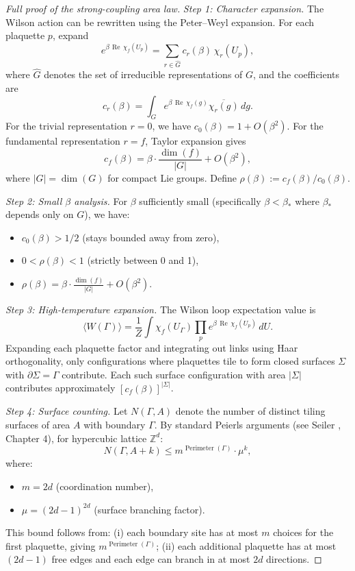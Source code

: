 \documentclass[11pt]{amsart}
\begin{document}
\begin{proof}[Full proof of the strong-coupling area law]
\emph{Step 1: Character expansion.} The Wilson action can be rewritten using the Peter–Weyl expansion. For each plaquette $p$, expand
\[
  e^{\beta\,\operatorname{Re}\,\chi_f(U_p)} = \sum_{r \in \widehat{G}} c_r(\beta)\,\chi_r(U_p),
\]
where $\widehat{G}$ denotes the set of irreducible representations of $G$, and the coefficients are
\[
  c_r(\beta) = \int_G e^{\beta\,\operatorname{Re}\,\chi_f(g)} \overline{\chi_r(g)}\,dg.
\]
For the trivial representation $r = 0$, we have $c_0(\beta) = 1 + O(\beta^2)$. For the fundamental representation $r = f$, Taylor expansion gives
\[
  c_f(\beta) = \beta \cdot \frac{\dim(f)}{|G|} + O(\beta^2),
\]
where $|G| = \dim(G)$ for compact Lie groups. Define $\rho(\beta) := c_f(\beta)/c_0(\beta)$.

\emph{Step 2: Small $\beta$ analysis.} For $\beta$ sufficiently small (specifically $\beta < \beta_*$ where $\beta_*$ depends only on $G$), we have:
\begin{itemize}
  \item $c_0(\beta) > 1/2$ (stays bounded away from zero),
  \item $0 < \rho(\beta) < 1$ (strictly between 0 and 1),
  \item $\rho(\beta) = \beta \cdot \frac{\dim(f)}{|G|} + O(\beta^2)$.
\end{itemize}

\emph{Step 3: High-temperature expansion.} The Wilson loop expectation value is
\[
  \langle W(\Gamma) \rangle = \frac{1}{Z} \int \chi_f(U_\Gamma) \prod_p e^{\beta\,\operatorname{Re}\,\chi_f(U_p)} \,dU.
\]
Expanding each plaquette factor and integrating out links using Haar orthogonality, only configurations where plaquettes tile to form closed surfaces $\Sigma$ with $\partial\Sigma = \Gamma$ contribute. Each such surface configuration with area $|\Sigma|$ contributes approximately $[c_f(\beta)]^{|\Sigma|}$.

\emph{Step 4: Surface counting.} Let $N(\Gamma, A)$ denote the number of distinct tiling surfaces of area $A$ with boundary $\Gamma$. By standard Peierls arguments (see Seiler \cite{Seiler1982}, Chapter 4), for hypercubic lattice $\mathbb{Z}^d$:
\[
  N(\Gamma, A + k) \le m^{\operatorname{Perimeter}(\Gamma)} \cdot \mu^k,
\]
where:
\begin{itemize}
  \item $m = 2d$ (coordination number),
  \item $\mu = (2d-1)^{2d}$ (surface branching factor).
\end{itemize}
This bound follows from: (i) each boundary site has at most $m$ choices for the first plaquette, giving $m^{\operatorname{Perimeter}(\Gamma)}$; (ii) each additional plaquette has at most $(2d-1)$ free edges and each edge can branch in at most $2d$ directions.


\end{proof}
\end{document}

